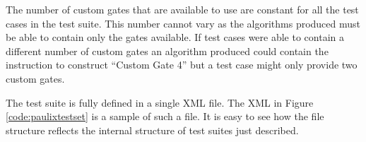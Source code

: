 The number of custom gates that are available to use are constant for all the test cases in the test suite.
This number cannot vary as the algorithms produced must be able to contain only the gates available.
If test cases were able to contain a different number of custom gates an algorithm produced could contain the instruction to construct ``Custom Gate 4'' but a test case might only provide two custom gates.

The test suite is fully defined in a single XML file.
The XML in Figure \ref{code:paulixtestset} is a sample of such a file.
It is easy to see how the file structure reflects the internal structure of test suites just described.

\lstset{language = XML,
basicstyle=\footnotesize,
breakatwhitespace=false,
numbers=none,
breaklines=true}
\begin{figure}
\centering
{}
\hspace{5em}
\end{figure}
